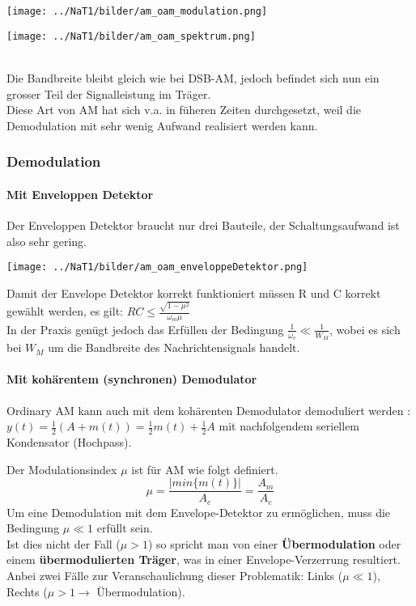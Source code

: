 \begin{minipage}[]{9cm}
	\texttt{[image: ../NaT1/bilder/am\_oam\_modulation.png]}
\end{minipage}
\begin{minipage}[]{9cm}
    \texttt{[image: ../NaT1/bilder/am\_oam\_spektrum.png]}
\end{minipage}\\
Die Bandbreite bleibt gleich wie bei DSB-AM, jedoch befindet sich nun ein grosser Teil der
Signalleistung im Träger. \\
Diese Art von AM hat sich v.a. in füheren Zeiten durchgesetzt, weil die Demodulation mit sehr
wenig Aufwand realisiert werden kann. 

\subsubsection{Demodulation}
\paragraph{Mit Enveloppen Detektor}
Der Enveloppen Detektor braucht nur drei Bauteile, der Schaltungsaufwand ist also
sehr gering.\\
\begin{center}	
      \texttt{[image: ../NaT1/bilder/am\_oam\_enveloppeDetektor.png]}
\end{center}
Damit der Envelope Detektor korrekt funktioniert müssen R und C korrekt gewählt werden, es gilt:
$RC \leq \frac{\sqrt{1 - \mu^2}}{\omega_m \mu}$ \\
In der Praxis genügt jedoch das Erfüllen der Bedingung $\frac{1}{\omega_c} \ll \frac{1}{W_M}$,
wobei es sich bei $W_M$ um die Bandbreite des Nachrichtensignals handelt. 

\paragraph{Mit kohärentem (synchronen) Demodulator}
Ordinary AM kann auch mit dem kohärenten Demodulator demoduliert werden
:
$y(t) = \frac12 (A + m(t)) = \frac12 m(t) + \frac12 A$ mit nachfolgendem
seriellem Kondensator (Hochpass).


Der Modulationsindex $\mu$ ist für AM wie folgt definiert.
$$\mu = \frac{|min\{m(t)\}|}{A_c} = \frac{A_m}{A_c} $$
Um eine Demodulation mit dem Envelope-Detektor zu ermöglichen, muss die Bedingung 
\textbf{$\mu \ll 1$} erfüllt sein. \\
Ist dies nicht der Fall (\textbf{$\mu > 1$}) so spricht man von einer \textbf{Übermodulation} oder
einem  \textbf{übermodulierten Träger}, was in einer Envelope-Verzerrung resultiert. \\
Anbei zwei Fälle zur Veranschaulichung dieser Problematik: Links ($\mu \ll 1$), Rechts ($\mu > 1
\rightarrow $ Übermodulation).

